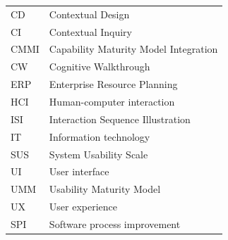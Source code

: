 \documentclass[12pt,a4paper,oneside,pdftex]{report}
\begin{document}
\noindent
\begin{longtable}{@{}p{}p{}@{}}
CD & Contextual Design \\
CI & Contextual Inquiry \\
CMMI & Capability Maturity Model Integration \\
CW & Cognitive Walkthrough\\
ERP & Enterprise Resource Planning \\
HCI & Human-computer interaction \\
ISI & Interaction Sequence Illustration \\
IT & Information technology \\
SUS & System Usability Scale \\
UI & User interface \\
UMM & Usability Maturity Model \\
UX & User experience \\
SPI & Software process improvement\\



\end{longtable}


\cleardoublepage
\tableofcontents


\end{document}
